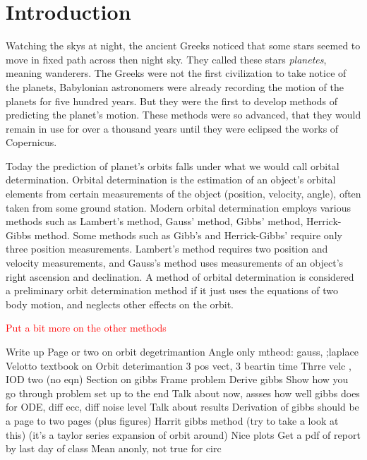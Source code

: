 \documentclass[12pt]{article}
\begin{document}
	\section{Introduction}

	Watching the skys at night, the ancient Greeks noticed that some stars seemed to move in fixed path across then night sky. They called these stars \textit{planetes}, meaning wanderers. The Greeks were not the first civilization to take notice of the planets, Babylonian astronomers were already recording the motion of the planets for five hundred years. But they were the first to develop methods of predicting the planet's motion. These methods were so advanced, that they would remain in use for over a thousand years until they were eclipsed the works of Copernicus\cite{lectureOnGreekAstro}. %
	
	Today the prediction of planet's orbits falls under what we would call orbital determination. Orbital determination is the estimation of an object's orbital elements from certain measurements of the object (position, velocity, angle), often taken from some ground station. Modern orbital determination employs various methods such as Lambert's method, Gauss' method, Gibbs' method, Herrick-Gibbs method. Some methods such as Gibb's and Herrick-Gibbs' require only three position measurements. Lambert's method requires two position and velocity measurements, and Gauss's method uses measurements of an object's right ascension and declination. A method of orbital determination is considered a preliminary orbit determination method if it just uses the equations of two body motion, and neglects other effects on the orbit. 
	
		\textcolor{red}{Put a bit more on the other methods}
	
	
		Write up
	Page or two on orbit degetrimantion
	Angle only mtheod: gauss, ;laplace
	Velotto textbook on Orbit deterimantion
	3 pos vect, 3 beartin time
	Thrre velc , IOD two
	(no eqn)
	Section on gibbs
	Frame problem
	Derive gibbs
	Show how you go through problem set up to the end
	Talk about now, assses how well gibbs does for ODE, diff ecc, diff noise level
	Talk about results
	Derivation of gibbs should be a page to two pages (plus figures)
	Harrit gibbs method (try to take a look at this) (it’s a taylor series expansion of orbit around)
	Nice plots
	Get a pdf of report by last day of class
	Mean  anonly, not true for circ
\end{document}
